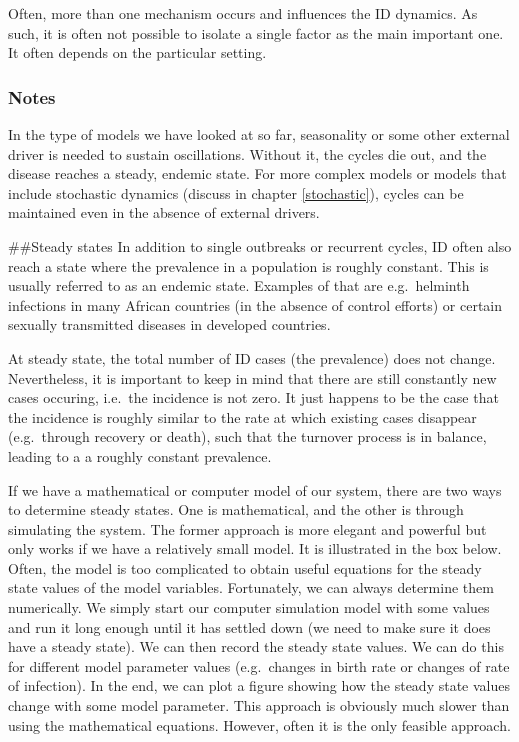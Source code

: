 \documentclass[]{book}
\theoremstyle{definition}
\theoremstyle{definition}
\theoremstyle{definition}
\theoremstyle{remark}
\begin{document}
Often, more than one mechanism occurs and influences the ID dynamics. As
such, it is often not possible to isolate a single factor as the main
important one. It often depends on the particular setting.

\hypertarget{mynotebox}{%
\subsubsection{Notes}\label{mynotebox}}

In the type of models we have looked at so far, seasonality or some
other external driver is needed to sustain oscillations. Without it, the
cycles die out, and the disease reaches a steady, endemic state. For
more complex models or models that include stochastic dynamics (discuss
in chapter \ref{stochastic}), cycles can be maintained even in the
absence of external drivers.

\#\#Steady states In addition to single outbreaks or recurrent cycles,
ID often also reach a state where the prevalence in a population is
roughly constant. This is usually referred to as an endemic state.
Examples of that are e.g.~helminth infections in many African countries
(in the absence of control efforts) or certain sexually transmitted
diseases in developed countries.

At steady state, the total number of ID cases (the prevalence) does not
change. Nevertheless, it is important to keep in mind that there are
still constantly new cases occuring, i.e.~the incidence is not zero. It
just happens to be the case that the incidence is roughly similar to the
rate at which existing cases disappear (e.g.~through recovery or death),
such that the turnover process is in balance, leading to a a roughly
constant prevalence.

If we have a mathematical or computer model of our system, there are two
ways to determine steady states. One is mathematical, and the other is
through simulating the system. The former approach is more elegant and
powerful but only works if we have a relatively small model. It is
illustrated in the box below. Often, the model is too complicated to
obtain useful equations for the steady state values of the model
variables. Fortunately, we can always determine them numerically. We
simply start our computer simulation model with some values and run it
long enough until it has settled down (we need to make sure it does have
a steady state). We can then record the steady state values. We can do
this for different model parameter values (e.g.~changes in birth rate or
changes of rate of infection). In the end, we can plot a figure showing
how the steady state values change with some model parameter. This
approach is obviously much slower than using the mathematical equations.
However, often it is the only feasible approach.
\end{document}
